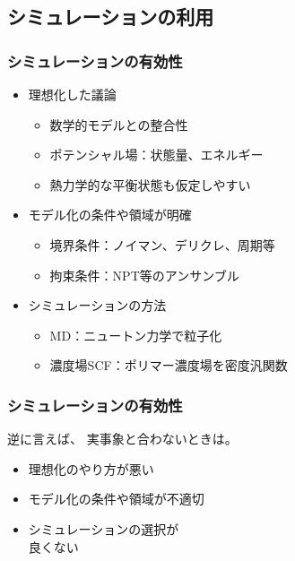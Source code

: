 \documentclass[10pt, dvipdfmx]{beamer}
\begin{document}
\subsection{シミュレーションの利用}
\begin{frame}\frametitle{シミュレーションの有効性}
\large
\begin{itemize}
	\item
	理想化した議論
	\large
	\begin{itemize}
		\large
		\item
		数学的モデルとの整合性
		\item
		ポテンシャル場：状態量、エネルギー	
		\item
		熱力学的な平衡状態も仮定しやすい
	\end{itemize}
	\item
	モデル化の条件や領域が明確
	\begin{itemize}
		\large
		\item
		境界条件：ノイマン、デリクレ、周期等
		\item
		拘束条件：NPT等のアンサンブル
	\end{itemize}
	\item
	シミュレーションの方法
	\begin{itemize}
		\large
		\item
		MD：ニュートン力学で粒子化
		\item
		濃度場SCF：ポリマー濃度場を密度汎関数		
	\end{itemize}
\end{itemize}
\end{frame}
\begin{frame}\frametitle{シミュレーションの有効性}
\LARGE

\begin{alertblock}{逆に言えば、}
実事象と合わないときは。
\begin{itemize}
	\item
	理想化のやり方が悪い
	\item
	モデル化の条件や領域が不適切
	\item
	シミュレーションの選択が\\良くない
\end{itemize}
\end{alertblock}
\end{frame}
\end{document}
